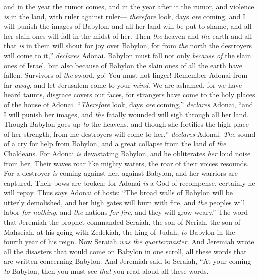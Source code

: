 \begin{biblechapter}
and in the year the rumor comes, 
and in the year after it the rumor, 
and violence \textit{is} in the land, 
with ruler against ruler—
\verse \textit{therefore} look, days \textit{are} coming, 
and I will punish the images of Babylon, 
and all her land will be put to shame, 
and all her slain ones will fall in the midst of her.
\verse Then \textit{the} heaven and \textit{the} earth and all that \textit{is} in them 
will shout for joy over Babylon, 
for from \textit{the} north 
the destroyers will come to it,” \textit{declares} Adonai.
\verse Babylon must fall not only \textit{because of} the slain ones of Israel, 
but also because of Babylon the slain ones of all the earth have fallen.
\verse Survivors of \textit{the} sword, go! 
You must not linger! 
Remember Adonai from far \textit{away}, 
and let Jerusalem come to your \textit{mind}.
\verse We are ashamed, 
for we have heard taunts, 
disgrace covers our faces, 
for strangers have come to the holy places of the house of Adonai.
\verse “\textit{Therefore} look, days \textit{are} coming,” \textit{declares} Adonai, 
“and I will punish her images, 
and \textit{the} fatally wounded will sigh through all her land.
\verse Though Babylon goes up \textit{to} the heavens, 
and though she fortifies the high place of her strength, 
from me destroyers will come to her,” \textit{declares} Adonai.
\verse \textit{The} sound of a cry for help from Babylon, 
and a great collapse from the land of \textit{the} Chaldeans.
\verse For Adonai \textit{is} devastating Babylon, 
and he obliterates \textit{her} loud noise from her. 
Their waves roar like mighty waters, 
the roar of their voices resounds.
\verse For a destroyer \textit{is} coming against her, against Babylon, 
and her warriors are captured. 
Their bows are broken; 
for Adonai \textit{is} a God of recompense, 
certainly he will repay.
\verse Thus says Adonai of hosts: “The broad walls of Babylon will be utterly demolished, 
and her high gates will burn with fire, 
and \textit{the} peoples will labor \textit{for nothing}, 
and \textit{the} nations \textit{for fire}, 
and they will grow weary.”
 The word that Jeremiah the prophet commanded Seraiah, the son of Neriah, the son of Mahseiah, at his going with Zedekiah, the king of Judah, \textit{to} Babylon in the fourth year of his reign. Now Seraiah \textit{was the} \textit{quartermaster}.
\verse And Jeremiah wrote all the disasters that would come on Babylon in one scroll, all these words that are written concerning Babylon.
\verse And Jeremiah said to Seraiah, “At your coming \textit{to} Babylon, then you must see \textit{that} you read aloud all these words.

\end{biblechapter}
